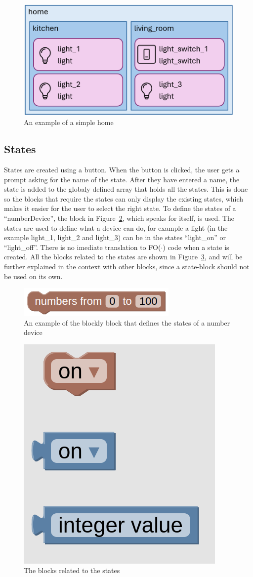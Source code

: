 \documentclass[11pt,a4paper]{report}
\newcommand{\fodot}{FO($\cdot$)\xspace}
\begin{document}
\begin{figure}
    \centering
    \includegraphics[width=0.8\linewidth]{images/custom_blocks_example.png}
    \caption{An example of a simple home}
    \label{fig:custom_blocks_example}
\end{figure}

\subsection{States}
States are created using a button. When the button is clicked, the user gets a prompt asking for the name of the state. After they have entered a name, the state is added to the globaly defined array that holds all the states. This is done so the blocks that require the states can only display the existing states, which makes it easier for the user to select the right state. To define the states of a ``numberDevice'', the block in Figure~\ref{fig:numberDeviceState}, which speaks for itself, is used. The states are used to define what a device can do, for example a light (in the example light\_1, light\_2 and light\_3) can be in the states ``light\_on'' or ``light\_off''. There is no imediate translation to \fodot code when a state is created. All the blocks related to the states are shown in Figure~\ref{fig:homy_state_blocks}, and will be further explained in the context with other blocks, since a state-block should not be used on its own.

\begin{figure}
    \centering
    \includegraphics[width=0.4\linewidth]{images/numberDeviceState.png}
    \caption{An example of the blockly block that defines the states of a number device}
    \label{fig:numberDeviceState}
\end{figure}

\begin{figure}
    \centering
    \includegraphics[width=0.2\linewidth]{images/homy_state_blocks.png}
    \caption{The blocks related to the states}
    \label{fig:homy_state_blocks}
\end{figure}
\end{document}
